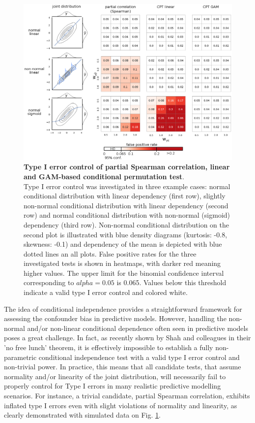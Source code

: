 \documentclass{article}
\begin{document}
\begin{figure}[!b]
  \centering
  \includegraphics[width=0.75\paperwidth]{fig/sim_h0_demo.eps}
  \caption{\textbf{Type I error control of partial Spearman correlation, linear and GAM-based conditional permutation test}. \\
  Type I error control was investigated in three example cases: normal conditional distribution with linear dependency (first row), slightly non-normal conditional distribution with linear dependency (second row) and normal conditional distribution with non-normal (sigmoid) dependency (third row). Non-normal conditional distribution on the second plot is illustrated with blue density diagrams (kurtosis: -0.8, skewness: -0.1) and dependency of the mean is depicted with blue dotted lines an all plots. False positive rates for the three investigated tests is shown in heatmaps, with darker red meaning higher values. The upper limit for the binomial confidence interval corresponding to $alpha=0.05$ is 0.065. Values below this threshold indicate a valid type I error control and colored white.
  }
  \label{fig:sim-h0-demo}
\end{figure}

The idea of conditional independence provides a straightforward framework for assessing the confounder bias in predictive models. However, handling the non-normal and/or non-linear conditional dependence often seen in predictive models\citep{garcia2009study, kristensen2017whole} poses a great challenge.
In fact, as recently shown by Shah and colleagues\cite{shah2020hardness} in their 'no free lunch' theorem, it is effectively impossible to establish a fully non-parametric conditional independence test with a valid type I error control and non-trivial power. In practice, this means that all candidate tests, that assume normality and/or linearity of the joint distribution, will necessarily fail to properly control for Type I errors in many realistic predictive modelling scenarios. For instance, a trivial candidate, partial Spearman correlation, exhibits inflated type I errors even with slight violations of normality and linearity, as clearly demonstrated with simulated data on Fig. \ref{fig:sim-h0-demo}.
\end{document}
